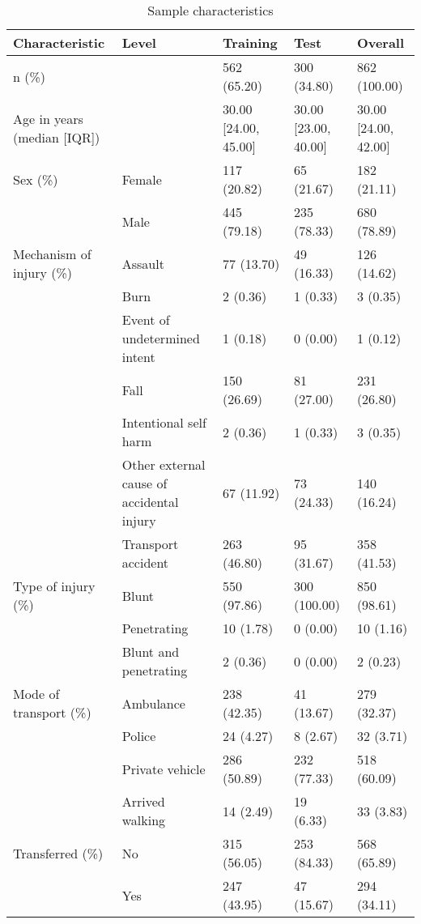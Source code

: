 \documentclass[10pt,letterpaper]{article}\usepackage[]{graphicx}\usepackage[]{color}
\begin{document}
\begin{table}[ht]
\centering
\caption{Sample characteristics} 
\label{tab:sample-characteristics}
\begin{adjustbox}{max width=\textwidth} 
\begin{tabular} 
{lllll}
  \hline
Characteristic & Level & Training & Test & Overall \\ 
  \hline
n (\%) &  & 562 (65.20) & 300 (34.80) & 862 (100.00) \\ 
  Age in years (median [IQR]) &  & 30.00 [24.00, 45.00] & 30.00 [23.00, 40.00] & 30.00 [24.00, 42.00] \\ 
  Sex (\%) & Female & 117 (20.82) & 65 (21.67) & 182 (21.11) \\ 
   & Male & 445 (79.18) & 235 (78.33) & 680 (78.89) \\ 
  Mechanism of injury (\%) & Assault & 77 (13.70) & 49 (16.33) & 126 (14.62) \\ 
   & Burn & 2 (0.36) & 1 (0.33) & 3 (0.35) \\ 
   & Event of undetermined intent & 1 (0.18) & 0 (0.00) & 1 (0.12) \\ 
   & Fall & 150 (26.69) & 81 (27.00) & 231 (26.80) \\ 
   & Intentional self harm & 2 (0.36) & 1 (0.33) & 3 (0.35) \\ 
   & Other external cause of accidental injury & 67 (11.92) & 73 (24.33) & 140 (16.24) \\ 
   & Transport accident & 263 (46.80) & 95 (31.67) & 358 (41.53) \\ 
  Type of injury (\%) & Blunt & 550 (97.86) & 300 (100.00) & 850 (98.61) \\ 
   & Penetrating & 10 (1.78) & 0 (0.00) & 10 (1.16) \\ 
   & Blunt and penetrating & 2 (0.36) & 0 (0.00) & 2 (0.23) \\ 
  Mode of transport (\%) & Ambulance & 238 (42.35) & 41 (13.67) & 279 (32.37) \\ 
   & Police & 24 (4.27) & 8 (2.67) & 32 (3.71) \\ 
   & Private vehicle & 286 (50.89) & 232 (77.33) & 518 (60.09) \\ 
   & Arrived walking & 14 (2.49) & 19 (6.33) & 33 (3.83) \\ 
  Transferred (\%) & No & 315 (56.05) & 253 (84.33) & 568 (65.89) \\ 
   & Yes & 247 (43.95) & 47 (15.67) & 294 (34.11) \\ 

\end{tabular}
\end{adjustbox}
\end{table}
\end{document}
